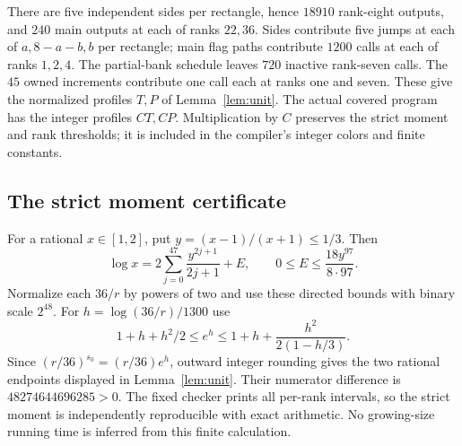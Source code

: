 There are five independent sides per rectangle, hence $18910$
rank-eight outputs, and $240$ main outputs at each of ranks $22,36$.
Sides contribute five jumps at each of $a,8-a-b,b$ per rectangle;
main flag paths contribute $1200$ calls at each of ranks $1,2,4$.
The partial-bank schedule leaves $720$ inactive rank-seven calls.
The $45$ owned increments contribute one call each at ranks one and
seven. These give the normalized profiles $T,P$ of Lemma~\ref{lem:unit}.
The actual covered program has the integer profiles $CT,CP$.
Multiplication by $C$ preserves the strict moment and rank thresholds;
it is included in the compiler's integer colors and finite constants.

\subsection{The strict moment certificate}
For a rational $x\in[1,2]$, put $y=(x-1)/(x+1)\le1/3$. Then
\[
 \log x=2\sum_{j=0}^{47}\frac{y^{2j+1}}{2j+1}+E,
 \qquad 0\le E\le\frac{18y^{97}}{8\cdot97}.
\]
Normalize each $36/r$ by powers of two and use these directed
bounds with binary scale $2^{48}$. For
$h=\log(36/r)/1300$ use
\[
 1+h+h^2/2\le e^h\le1+h+\frac{h^2}{2(1-h/3)}.
\]
Since $(r/36)^{s_0}=(r/36)e^h$, outward integer rounding gives the
two rational endpoints displayed in Lemma~\ref{lem:unit}. Their
numerator difference is $48274644696285>0$. The fixed checker prints
all per-rank intervals, so the strict moment is independently
reproducible with exact arithmetic. No growing-size running time is
inferred from this finite calculation.

